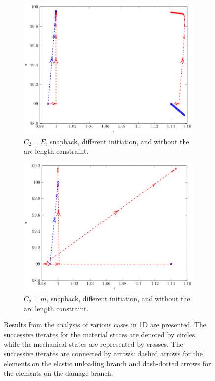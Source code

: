 \documentclass[11pt]{elsarticle}
\begin{document}
\begin{figure}
\begin{subfigure}{0.45\textwidth}
		\centering
		\includegraphics[scale=0.7]{./conv_figs/bad_metric_snap_no_arclength_add.pdf}
		\caption{$C_2=E$, snapback, different initiation, and without the arc length constraint.}
		\label{bad_metric_snap_no_arclength_add}
	\end{subfigure}
	\hfill
	\begin{subfigure}{0.45\textwidth}
		\centering
		\includegraphics[scale=0.7]{./conv_figs/good_metric_snap_no_arclength_add.pdf}
		\caption{$C_2=m$, snapback, different initiation, and without the arc length constraint.}
		\label{good_metric_snap_no_arclength_add}
	\end{subfigure}
	\caption{Results from the analysis of various cases in 1D are presented. The successive iterates for the material states are denoted by circles, while the mechanical states are represented by crosses. The successive iterates are connected by arrows: dashed arrows for the elements on the elastic unloading branch and dash-dotted arrows for the elements on the damage branch.}
\end{figure}
\end{document}
